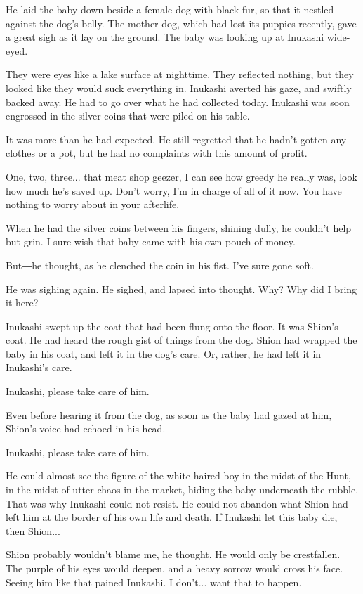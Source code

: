 He laid the baby down beside a female dog with black fur, so that it
nestled against the dog's belly. The mother dog, which had lost its
puppies recently, gave a great sigh as it lay on the ground. The baby
was looking up at Inukashi wide-eyed.

They were eyes like a lake surface at nighttime. They reflected nothing,
but they looked like they would suck everything in. Inukashi averted his
gaze, and swiftly backed away. He had to go over what he had collected
today. Inukashi was soon engrossed in the silver coins that were piled
on his table.

It was more than he had expected. He still regretted that he hadn't
gotten any clothes or a pot, but he had no complaints with this amount
of profit.

One, two, three... that meat shop geezer, I can see how greedy he really
was, look how much he's saved up. Don't worry, I'm in charge of all of
it now. You have nothing to worry about in your afterlife.

When he had the silver coins between his fingers, shining dully, he
couldn't help but grin. I sure wish that baby came with his own pouch of
money.

But―he thought, as he clenched the coin in his fist. I've sure gone
soft.

He was sighing again. He sighed, and lapsed into thought. Why? Why did I
bring it here?

Inukashi swept up the coat that had been flung onto the floor. It was
Shion's coat. He had heard the rough gist of things from the dog. Shion
had wrapped the baby in his coat, and left it in the dog's care. Or,
rather, he had left it in Inukashi's care.

Inukashi, please take care of him.

Even before hearing it from the dog, as soon as the baby had gazed at
him, Shion's voice had echoed in his head.

Inukashi, please take care of him.

He could almost see the figure of the white-haired boy in the midst of
the Hunt, in the midst of utter chaos in the market, hiding the baby
underneath the rubble. That was why Inukashi could not resist. He could
not abandon what Shion had left him at the border of his own life and
death. If Inukashi let this baby die, then Shion...

Shion probably wouldn't blame me, he thought. He would only be
crestfallen. The purple of his eyes would deepen, and a heavy sorrow
would cross his face. Seeing him like that pained Inukashi. I don't...
want that to happen.

